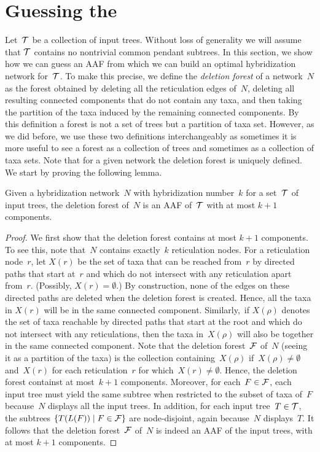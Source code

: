 \section{Guessing the \aaf}\label{sec:aaf-guessing}

\noindent
{Let~$\mathcal{T}$ be a collection of input trees.} Without loss of generality we will assume that {$\mathcal{T}$ contains} no nontrivial common pendant subtrees. {In this section, we show how we can guess an AAF from which we can build an optimal hybridization network for~$\mathcal{T}$. To make this precise, we define the \emph{deletion forest} of a network~$N$ as} the forest obtained by deleting all the reticulation edges of~$N$, deleting all resulting connected components that do not contain any taxa, and then taking the partition of the taxa induced by the remaining connected components. By this definition a forest is not a set of trees but a partition of taxa set. However, as we did before, we use these two definitions interchangeably as sometimes it is more useful to see a forest as a collection of trees and sometimes as a collection of taxa sets. Note that for a given network the deletion forest is uniquely defined. {We start by proving the following lemma.}

\begin{lem}
  \label{lem:network-to-aaf}
Given a hybridization network~$N$ with hybridization number~$k$ {for a set~$\mathcal{T}$ of input trees}, the deletion forest of~$N$ {is} an AAF of~$\mathcal{T}$ with at most $k+1$ components.
\end{lem}
\begin{proof}
We first show that the deletion forest contains at most $k+1$ components. To see this, note that~$N$ contains exactly~$k$ reticulation nodes. For a reticulation node~$r$, let $X(r)$ be the set of taxa that can be reached from~$r$ by directed paths that start at~$r$ and which do not intersect with any reticulation {apart from~$r$}. (Possibly, $X(r)=\emptyset$.) By construction, none of the edges on these directed paths are deleted when the deletion forest is created. Hence, all the taxa in $X(r)$ will be in the same connected component. Similarly,~{if $X(\rho)$ denotes the set of taxa reachable by directed paths that start at the root and which do not intersect with any reticulations, then the taxa in~$X(\rho)$ will also be together in the same connected component. Note that the deletion forest~$\mathcal{F}$ of~$N$ (seeing it as a partition of the taxa) is the collection containing~$X(\rho)$ if~$X(\rho)\neq\emptyset$ and~$X(r)$ for each reticulation~$r$ for which~$X(r)\neq\emptyset$. Hence, the deletion forest containst at most~$k+1$ components. Moreover, for each~$F\in\mathcal{F}$, each input tree must yield the same subtree when restricted to the subset of taxa of~$F$ because~$N$ displays all the input trees. In addition, for each input tree~$T\in\mathcal{T}$, the subtrees $\{T(L(F)) \mid F\in\mathcal{F}\}$ are node-disjoint, again because~$N$ displays~$T$. It follows that the deletion forest~$\mathcal{F}$ of~$N$ is indeed an AAF of the input trees,
with at most $k+1$ components.}
\end{proof}

